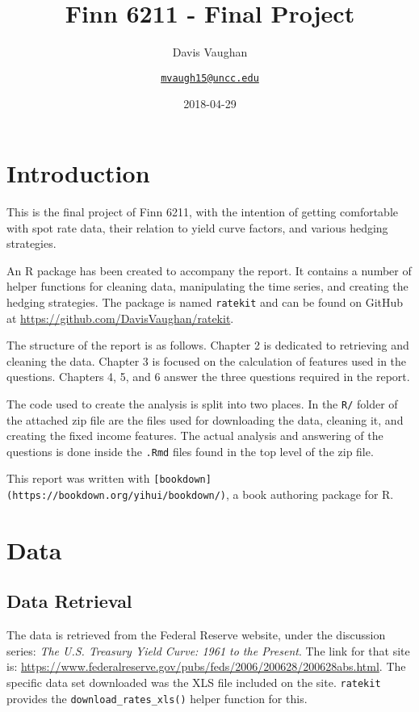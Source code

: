 \documentclass[openany]{book}
\title{Finn 6211 - Final Project}
\subtitle{Davis Vaughan}
\author{\href{mailto:mvaugh15@uncc.edu}{\nolinkurl{mvaugh15@uncc.edu}}}
\date{2018-04-29}
\theoremstyle{definition}
\theoremstyle{definition}
\theoremstyle{definition}
\theoremstyle{remark}
\begin{document}
\maketitle

{
\setcounter{tocdepth}{1}
\tableofcontents
}
\hypertarget{titlepage}{%
\chapter{Introduction}\label{titlepage}}

This is the final project of Finn 6211, with the intention of getting
comfortable with spot rate data, their relation to yield curve factors,
and various hedging strategies.

An R package has been created to accompany the report. It contains a
number of helper functions for cleaning data, manipulating the time
series, and creating the hedging strategies. The package is named
\texttt{ratekit} and can be found on GitHub at
\url{https://github.com/DavisVaughan/ratekit}.

The structure of the report is as follows. Chapter 2 is dedicated to
retrieving and cleaning the data. Chapter 3 is focused on the
calculation of features used in the questions. Chapters 4, 5, and 6
answer the three questions required in the report.

The code used to create the analysis is split into two places. In the
\texttt{R/} folder of the attached zip file are the files used for
downloading the data, cleaning it, and creating the fixed income
features. The actual analysis and answering of the questions is done
inside the \texttt{.Rmd} files found in the top level of the zip file.

This report was written with
\texttt{{[}bookdown{]}(https://bookdown.org/yihui/bookdown/)}, a book
authoring package for R.

\small

\normalsize

\hypertarget{data}{%
\chapter{Data}\label{data}}

\hypertarget{retrieve}{%
\section{Data Retrieval}\label{retrieve}}

The data is retrieved from the Federal Reserve website, under the
discussion series: \emph{The U.S. Treasury Yield Curve: 1961 to the
Present}. The link for that site is:
\url{https://www.federalreserve.gov/pubs/feds/2006/200628/200628abs.html}.
The specific data set downloaded was the XLS file included on the site.
\texttt{ratekit} provides the \texttt{download\_rates\_xls()} helper
function for this.
\end{document}
